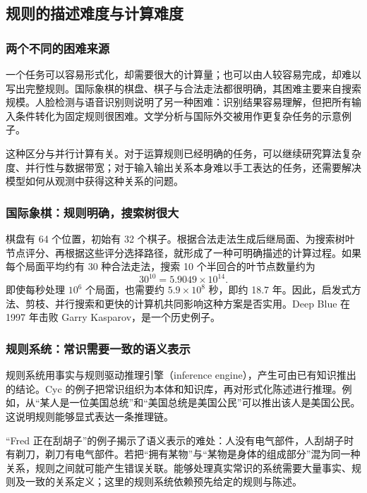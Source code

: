 \subsection{规则的描述难度与计算难度}

\subsubsection{两个不同的困难来源}
一个任务可以容易形式化，却需要很大的计算量；也可以由人较容易完成，却难以写出完整规则。国际象棋的棋盘、棋子与合法走法都很明确，其困难主要来自搜索规模。人脸检测与语音识别则说明了另一种困难：识别结果容易理解，但把所有输入条件转化为固定规则很困难。文学分析与国际外交被用作更复杂任务的示意例子。

这种区分与并行计算有关。对于运算规则已经明确的任务，可以继续研究算法复杂度、并行性与数据带宽；对于输入输出关系本身难以手工表达的任务，还需要解决模型如何从观测中获得这种关系的问题。

\subsubsection{国际象棋：规则明确，搜索树很大}
棋盘有 64 个位置，初始有 32 个棋子。根据合法走法生成后继局面、为搜索树叶节点评分、再根据这些评分选择路径，就形成了一种可明确描述的计算过程。如果每个局面平均约有 30 种合法走法，搜索 10 个半回合的叶节点数量约为
\begin{equation}
30^{10}=5.9049\times10^{14}.
\end{equation}
即使每秒处理 $10^6$ 个局面，也需要约 $5.9\times10^8$ 秒，即约 18.7 年。因此，启发式方法、剪枝、并行搜索和更快的计算机共同影响这种方案是否实用。Deep Blue 在 1997 年击败 Garry Kasparov，是一个历史例子。

\subsubsection{规则系统：常识需要一致的语义表示}
规则系统用事实与规则驱动推理引擎（inference engine），产生可由已有知识推出的结论。Cyc 的例子把常识组织为本体和知识库，再对形式化陈述进行推理。例如，从“某人是一位美国总统”和“美国总统是美国公民”可以推出该人是美国公民。这说明规则能够显式表达一条推理链。

“Fred 正在刮胡子”的例子揭示了语义表示的难处：人没有电气部件，人刮胡子时有剃刀，剃刀有电气部件。若把“拥有某物”与“某物是身体的组成部分”混为同一种关系，规则之间就可能产生错误关联。能够处理真实常识的系统需要大量事实、规则及一致的关系定义；这里的规则系统依赖预先给定的规则与陈述。

